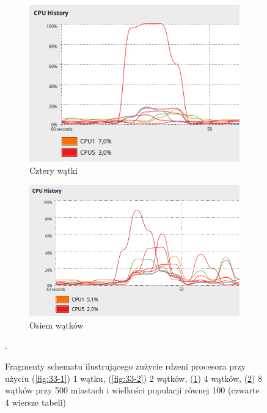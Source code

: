 \documentclass[10pt,a4paper]{article}
\begin{document}
\begin{figure}[H]
    \begin{subfigure}[b]{0.4\textwidth}
        \includegraphics[width=\textwidth]{33-4.png}
        \caption{Cztery wątki}
        \label{fig:33-4}
    \end{subfigure} 
    \begin{subfigure}[b]{0.4\textwidth}
            \includegraphics[width=\textwidth]{33-8.png}
            \caption{Osiem wątków}
            \label{fig:33-8}
    \end{subfigure}
    \caption{Fragmenty schematu ilustrującego zużycie rdzeni procesora przy użyciu (\ref{fig:33-1}) 1 wątku, (\ref{fig:33-2}) 2 wątków, (\ref{fig:33-4}) 4 wątków, (\ref{fig:33-8}) 8 wątków przy 500 miastach i wielkości populacji równej 100 (czwarte 4 wiersze tabeli)}\label{fig:33}. 
\end{figure}
\end{document}
